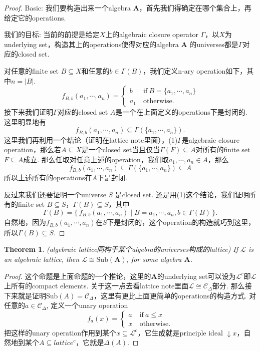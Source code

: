 \documentclass{article}
\newtheorem{theorem}{Theorem}[section]
\newcommand\Set[2]{\{\,#1\mid#2\,\}} %
\newcommand\lattice{\mathcal{L}}
\newcommand\algebra{\mathbf{A}}
\newcommand\Sub[1]{\text{Sub}(#1)}
\begin{document}
\begin{proof}
Basic: 我们要构造出来一个algebra $\algebra$，首先我们得确定在哪个集合上，再给定它的operations. 

我们的目标: 当前的前提是给定$X$上的algebraic closure operator $\Gamma$，以$X$为underlying set，构造其上的operations使得对应的algebra $\algebra$ 的universes都是$\Gamma$对应的closed set.

对任意的finite set $B \subseteq X$和任意的$b \in \Gamma(B)$，我们定义n-ary operation如下，其中$n = |B|$.
$$
f_{B,b}(a_1,\cdots,a_n) = \left\{
\begin{array}{ll} 
b \ & \text{if}\ B=\{a_1,\cdots,a_n\} \\ 
a_1\ & \text{otherwise}.  
\end{array}
\right.   
$$
接下来我们证明$\Gamma$对应的closed set $A$是一个在上面定义的operations下是封闭的. 这里明显地有
$$
f_{B,b}(a_1,\cdots,a_n) \subseteq \Gamma(\{a_1,\cdots,a_n\}).
$$
这里我们再利用一个结论（证明在lattice note里面），(1)$\Gamma$是algebraic closure operation，那么若$A \subseteq X$是一个closed set当且仅当$\Gamma(F) \subseteq A$对所有的finite set $F \subseteq A$成立. 那么任取对任意上述的operation，我们取$a_1,\cdots,a_n \in A$，那么
$$
f_{B,b}(a_1,\cdots,a_n) \subseteq \Gamma(\{a_1,\cdots,a_n\}) \subseteq A
$$
所以上述所有的operations在$A$下是封闭.

反过来我们还要证明一个universe $S$ 是closed set. 还是用(1)这个结论，我们证明所有的finite set $B \subseteq S$，$\Gamma(B) \subseteq S$，其中
$$
\Gamma(B) = \Set{f_{B,b}(a_1,\cdots,a_n)}{B={a_1,\cdots,a_n},b \in \Gamma(B)}.
$$
自然地，因为$f_{B,b}(a_1,\cdots,a_n)$在$S$下是封闭的，这个operation的构造就巧到这里，所以$\Gamma(B) \subseteq S$.
\end{proof}


\begin{theorem}
\rm {\color{red} (algebraic lattice同构于某个algebra的universes构成的lattice)} If $\lattice$ is an algebraic lattice, then $\lattice \cong \Sub{\algebra}$, for some algebra $\algebra$.
\end{theorem}

\begin{proof}
这个命题是上面命题的一个推论，这里的$\algebra$的underlying set可以设为$\lattice^c$即$\lattice$上所有的compact elements. 关于这一点去看lattice note里面$\lattice \cong \mathcal{C}_{\Delta}$部分. 那么接下来就是证明$\Sub{A} =  \mathcal{C}_{\Delta}$，这里有更比上面更简单的operations的构造方式. 对任意的$a \in \mathcal{C}_{\Delta}$, 定义一个unary operation
$$
f_{a}(x) = \left\{
\begin{array}{ll} 
a \ & \text{if}\ a \leq x \\ 
x\ & \text{otherwise}.  
\end{array}
\right.  
$$
把这样的unary operation作用到某个$x \subseteq \lattice^c$，它生成就是principle ideal $\downarrow x$，自然地到某个$A \subseteq lattice^c$，它就是$\Delta(A)$.
\end{proof}
\end{document}
